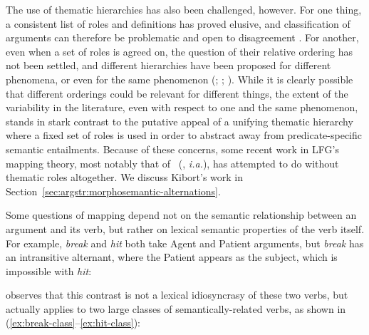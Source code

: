 \documentclass[output=paper]{langscibook}
\begin{document}
The use of thematic hierarchies has also been challenged, however. For one
thing, a consistent list of roles and definitions has proved elusive, and
classification of arguments can therefore be problematic and open to
disagreement
\citep{gawron:phdthesis,Dowty1991,ackerman:protoroles,davis:thematicroles}. For
another, even when a set of roles is agreed on, the question of their relative
ordering has not been settled, and different hierarchies have been proposed for
different phenomena, or even for the same phenomenon
(\citealp[65ff.]{Newmeyer2002}; \citealp[ch.~6]{levin-hovav05};
\citealp{rappaport:thematic}). While it is clearly possible that different
orderings could be relevant for different things, the extent of the variability
in the literature, even with respect to one and the same phenomenon, stands in
stark contrast to the putative appeal of a unifying thematic hierarchy where a
fixed set of roles is used in order to abstract away from predicate-specific
semantic entailments. Because of these concerns, some recent work in LFG's
mapping theory, most notably that of
\citeauthor{Kibort2007}~(\citeyear{Kibort2007}, \textit{i.a.}), has attempted
to do without thematic roles altogether. We discuss Kibort's work in
Section~\ref{sec:argstr:morphosemantic-alternations}.

Some questions of mapping depend not on the semantic relationship between an
argument and its verb, but rather on lexical semantic properties of the verb
itself. For example, \textit{break} and \textit{hit} both take Agent and Patient
arguments, but \textit{break} has an intransitive alternant, where the Patient
appears as the subject, which is impossible with \textit{hit}:

\begin{exe}
\ex\label{ex:break}
\begin{xlist}
\end{xlist}
%
\ex\label{ex:hit}
\begin{xlist}
\end{xlist}
\end{exe}

\noindent \citet{fillmore1970} observes that this contrast is not a lexical
idiosyncrasy of these two verbs, but actually applies to two large classes of
semantically-related verbs, as shown in
(\ref{ex:break-class}--\ref{ex:hit-class}):%
%
%
\end{document}
